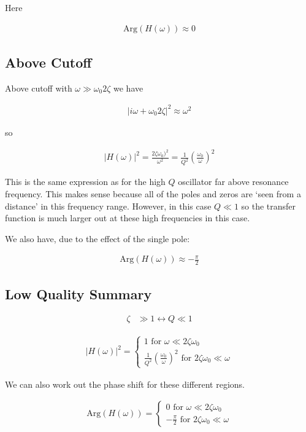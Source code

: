 \documentclass[12pt]{article}
\begin{document}
Here

\begin{align}
\text{Arg}(H(\omega)) \approx 0
\end{align}

\subsection{Above Cutoff}

Above cutoff with $\omega \gg \omega_0 2 \zeta$ we have

\begin{align}
|i\omega + \omega_0 2 \zeta|^2 \approx \omega^2
\end{align}

so

\begin{align}
|H(\omega)|^2 = \frac{2\zeta \omega_0)^2}{\omega^2} = \frac{1}{Q^2}\left(\frac{\omega_0}{\omega} \right)^2
\end{align}

This is the same expression as for the high $Q$ oscillator far above resonance frequency. This makes sense because all of the poles and zeros are `seen from a distance' in this frequency range. However, in this case $Q\ll1$ so the transfer function is much larger out at these high frequencies in this case.

We also have, due to the effect of the single pole:

\begin{align}
\text{Arg}(H(\omega)) \approx -\frac{\pi}{2}
\end{align}

\subsection{Low Quality Summary}

\begin{align}
\zeta &\gg 1 \leftrightarrow Q \ll 1
\end{align}

\begin{align}
|H(\omega)|^2 =
\begin{cases}
1 \text{ for } \omega \ll 2\zeta\omega_0\\
\frac{1}{Q^2}\left(\frac{\omega_0}{\omega} \right)^2 \text{ for } 2\zeta \omega_0 \ll \omega
\end{cases}
\end{align}

We can also work out the phase shift for these different regions. 

\begin{align}
\text{Arg}(H(\omega)) =
\begin{cases}
0 \text{ for } \omega \ll 2\zeta \omega_0\\
-\frac{\pi}{2} \text{ for } 2\zeta \omega_0 \ll \omega
\end{cases}
\end{align}
\end{document}

